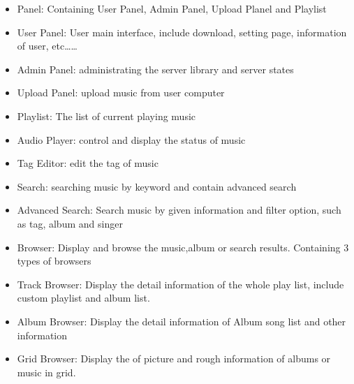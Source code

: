 \documentclass[12pt, a4paper, oneside]{article}
\newcommand{\env}[2]{\begin{#1}#2\end{#1}}
\begin{document}
\env{itemize}{
\item Panel: Containing User Panel, Admin Panel, Upload Planel and Playlist
\item User Panel: User main interface, include download, setting page, information of user, etc……
\item Admin Panel: administrating the server library and server states
\item Upload Panel: upload music from user computer
\item Playlist: The list of current playing music
\item Audio Player: control and display the status of music
\item Tag Editor: edit the tag of music
\item Search: searching music by keyword and contain advanced search
\item Advanced Search: Search music by given information and filter option, such as tag, album and singer
\item Browser: Display and browse the music,album or search results. Containing 3 types of browsers
\item Track Browser: Display the detail information of the whole play list, include custom playlist and album list.
\item Album Browser: Display the detail information of Album song list and other information
\item Grid Browser: Display the of picture and rough information of albums or music in grid.
}
\end{document}
